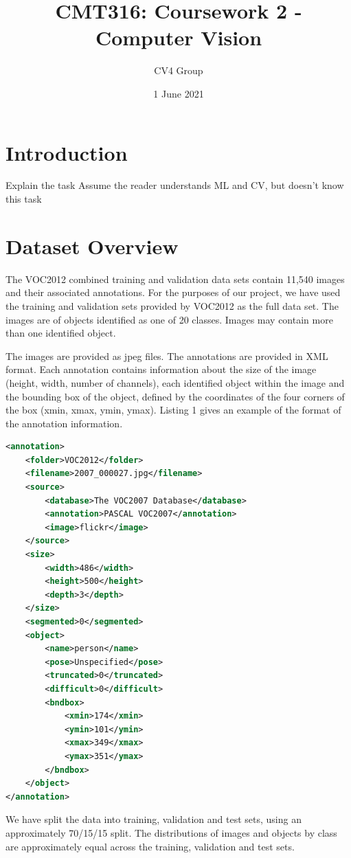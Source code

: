 \documentclass{article}
\title{CMT316: Coursework 2 - Computer Vision}
\author{CV4 Group}
\date{1 June 2021}
\begin{document}
\maketitle

\section{Introduction}

Explain the task
Assume the reader understands ML and CV, but doesn't know this task


\section{Dataset Overview}

The VOC2012 combined training and validation data sets contain 11,540 images and their associated annotations. For the purposes of our project, we have used the training and validation sets provided by VOC2012 as the full data set. The images are of objects identified as one of 20 classes. Images may contain more than one identified object. 

The images are provided as jpeg files. The annotations are provided in XML format. Each annotation contains information about the size of the image (height, width, number of channels), each identified object within the image and the bounding box of the object, defined by the coordinates of the four corners of the box (xmin, xmax, ymin, ymax). Listing 1 gives an example of the format of the annotation information.

\begin{lstlisting}[language=XML, caption=Annotation example]
<annotation>
	<folder>VOC2012</folder>
	<filename>2007_000027.jpg</filename>
	<source>
		<database>The VOC2007 Database</database>
		<annotation>PASCAL VOC2007</annotation>
		<image>flickr</image>
	</source>
	<size>
		<width>486</width>
		<height>500</height>
		<depth>3</depth>
	</size>
	<segmented>0</segmented>
	<object>
		<name>person</name>
		<pose>Unspecified</pose>
		<truncated>0</truncated>
		<difficult>0</difficult>
		<bndbox>
			<xmin>174</xmin>
			<ymin>101</ymin>
			<xmax>349</xmax>
			<ymax>351</ymax>
		</bndbox>
	</object>
</annotation>

\end{lstlisting}

We have split the data into training, validation and test sets, using an approximately 70/15/15 split. The distributions of images and objects by class are approximately equal across the training, validation and test sets.
\end{document}
